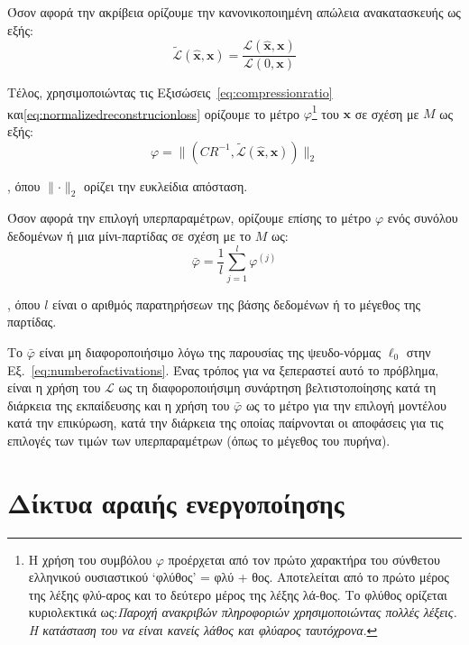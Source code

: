 Όσον αφορά την ακρίβεια ορίζουμε την κανονικοποιημένη απώλεια ανακατασκευής ως εξής:
\begin{equation}
	\label{eq:normalizedreconstrucionloss}
	\tilde{\mathcal{L}}(\hat{\bm{x}},\bm{x}) = \frac{\mathcal{L}(\hat{\bm{x}},\bm{x})}{\mathcal{L}(0,\bm{x})}
\end{equation}

Τέλος, χρησιμοποιώντας τις Εξισώσεις~\ref{eq:compressionratio} και\ref{eq:normalizedreconstrucionloss} ορίζουμε το μέτρο $\varphi$\footnote{Η χρήση του συμβόλου $\varphi$ προέρχεται από τον πρώτο χαρακτήρα του σύνθετου ελληνικού ουσιαστικού `φλύθος' = φλύ + θος. Αποτελείται από το πρώτο μέρος της λέξης φλύ-αρος και το δεύτερο μέρος της λέξης λά-θος. Το φλύθος ορίζεται κυριολεκτικά ως:\textit{Παροχή ανακριβών πληροφοριών χρησιμοποιώντας πολλές λέξεις. Η κατάσταση του να είναι κανείς λάθος και φλύαρος ταυτόχρονα}.} του $\bm{x}$ σε σχέση με $M$ ως εξής:
\begin{equation}
	\label{eq:flethos}
	\varphi = \lVert(CR^{-1}, \tilde{\mathcal{L}}(\hat{\bm{x}},\bm{x}))\rVert_2
\end{equation}

\noindent
, όπου $\lVert\cdot\rVert_2$ ορίζει την ευκλείδια απόσταση.

Όσον αφορά την επιλογή υπερπαραμέτρων, ορίζουμε επίσης το μέτρο $\varphi$ ενός συνόλου δεδομένων ή μια μίνι-παρτίδας σε σχέση με το $M$ ως:
\begin{equation}
	\label{eq:meanflethos}
	\bar\varphi = \frac{1}{l} \sum \limits_{j=1}^l \varphi^{(j)}
\end{equation}

\noindent
, όπου $l$ είναι ο αριθμός παρατηρήσεων της βάσης δεδομένων ή το μέγεθος της παρτίδας.

Το $\bar\varphi$ είναι μη διαφοροποιήσιμο λόγω της παρουσίας της ψευδο-νόρμας $\ell_0$ στην Εξ.~\ref{eq:numberofactivations}.
Ένας τρόπος για να ξεπεραστεί αυτό το πρόβλημα, είναι η χρήση του $\mathcal{L}$ ως τη διαφοροποιήσιμη συνάρτηση βελτιστοποίησης κατά τη διάρκεια της εκπαίδευσης και η χρήση του $\bar\varphi$ ως το μέτρο για την επιλογή μοντέλου κατά την επικύρωση, κατά την διάρκεια της οποίας παίρνονται οι αποφάσεις για τις επιλογές των τιμών των υπερπαραμέτρων (όπως το μέγεθος του πυρήνα).

\section{Δίκτυα αραιής ενεργοποίησης}
\label{sec6:sans}

